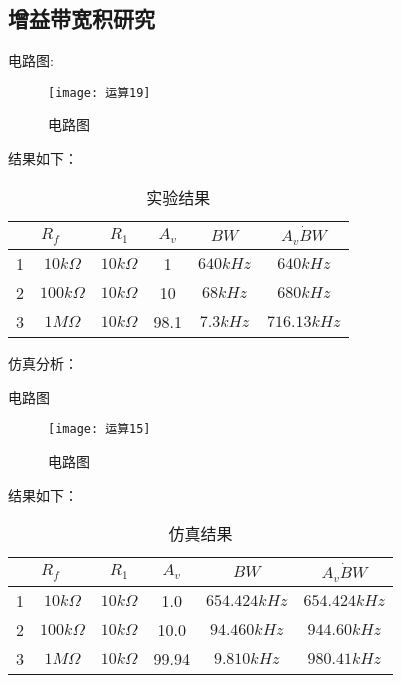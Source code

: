 \documentclass{../source/Experiment}
\begin{document}
            \subsection{增益带宽积研究}
            电路图:
            \newpage
            \begin{figure}[h]
                \centering
                \texttt{[image: 运算19]}
                \caption{电路图}
            \end{figure}
            结果如下：
            \begin{table}[h]
                \centering
                \begin{tabular}{|c|c|c|c|c|c|}
                \hline
                \multicolumn{2}{|c|}{$R_f$} & $R_1$       & $A_v$ & $BW$     & $A_v \dot BW$ \\ \hline
                1       & $10k\Omega$       & $10k\Omega$ & 1     & $640kHz$ & $640kHz$      \\ \hline
                2       & $100k\Omega$      & $10k\Omega$ & 10    & $68kHz$  & $680kHz$      \\ \hline
                3       & $1M\Omega$        & $10k\Omega$ & 98.1  & $7.3kHz$ & $716.13kHz$   \\ \hline
                \end{tabular}
                \caption{实验结果}
                \end{table}
                \par
            仿真分析：\par
            电路图
            \newpage
            \begin{figure}[h]
                \centering
                \texttt{[image: 运算15]}
                \caption{电路图}
            \end{figure}
            结果如下：
            \begin{table}[h]
                \centering
                \begin{tabular}{|c|c|c|c|c|c|}
                \hline
                \multicolumn{2}{|c|}{$R_f$} & $R_1$       & $A_v$ & $BW$     & $A_v \dot BW$ \\ \hline
                1       & $10k\Omega$       & $10k\Omega$ & 1.0 & $654.424kHz$ & $654.424kHz$      \\ \hline
                2       & $100k\Omega$      & $10k\Omega$ & 10.0    & $94.460kHz$  & $944.60kHz$      \\ \hline
                3       & $1M\Omega$        & $10k\Omega$ & 99.94  & $9.810kHz$ & $980.41kHz$   \\ \hline
                \end{tabular}
                \caption{仿真结果}
                \end{table}
\end{document}
